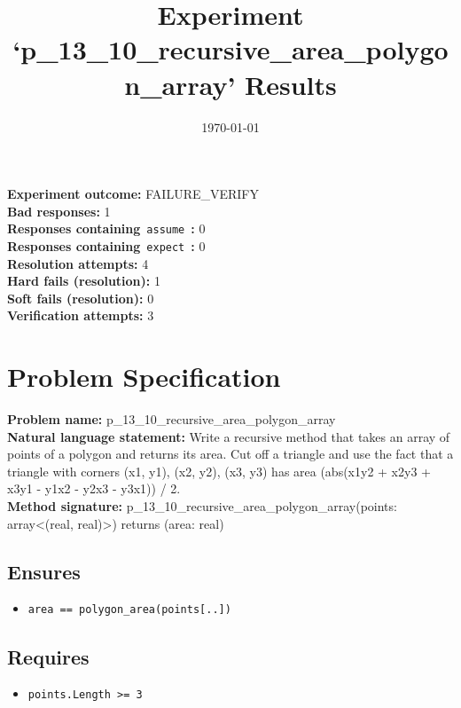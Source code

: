 \documentclass{article}
\begin{document}
\title{Experiment `p\_13\_10\_recursive\_area\_polygon\_array' Results}
\author{\today}
\date{}
\maketitle
\textbf{Experiment outcome: }FAILURE\_VERIFY
\\\textbf{Bad responses: }1
\\\textbf{Responses containing}~\texttt{assume}~\textbf{: }0
\\\textbf{Responses containing}~\texttt{expect}~\textbf{: }0
\\\textbf{Resolution attempts: }4
\\\textbf{Hard fails (resolution): }1
\\\textbf{Soft fails (resolution): }0
\\\textbf{Verification attempts: }3
\section*{Problem Specification}
\textbf{Problem name: }p\_13\_10\_recursive\_area\_polygon\_array
\\\textbf{Natural language statement: }Write a recursive method that takes an array of points of a polygon and returns its area. Cut off a triangle and use the fact that a triangle with corners (x1, y1), (x2, y2), (x3, y3) has area (abs(x1y2 + x2y3 + x3y1 - y1x2 - y2x3 - y3x1)) / 2.
\\\textbf{Method signature: }p\_13\_10\_recursive\_area\_polygon\_array(points: array<(real, real)>) returns (area: real)
\subsection*{Ensures}
\begin{itemize}
\item \texttt{area == polygon\_area(points[..])}
\end{itemize}
\subsection*{Requires}
\begin{itemize}
\item \texttt{points.Length >= 3}
\end{itemize}
\end{document}
